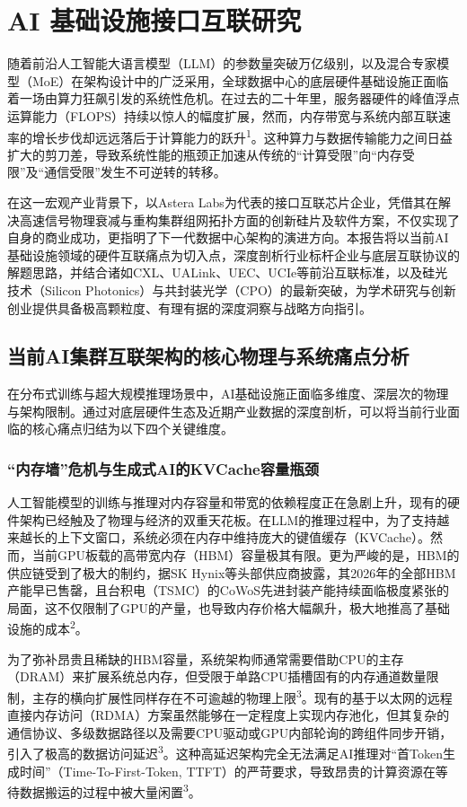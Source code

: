 \chapter{AI 基础设施接口互联研究}

随着前沿人工智能大语言模型（LLM）的参数量突破万亿级别，以及混合专家模型（MoE）在架构设计中的广泛采用，全球数据中心的底层硬件基础设施正面临着一场由算力狂飙引发的系统性危机。在过去的二十年里，服务器硬件的峰值浮点运算能力（FLOPS）持续以惊人的幅度扩展，然而，内存带宽与系统内部互联速率的增长步伐却远远落后于计算能力的跃升\textsuperscript{1}。这种算力与数据传输能力之间日益扩大的剪刀差，导致系统性能的瓶颈正加速从传统的``计算受限''向``内存受限''及``通信受限''发生不可逆转的转移。

在这一宏观产业背景下，以Astera Labs为代表的接口互联芯片企业，凭借其在解决高速信号物理衰减与重构集群组网拓扑方面的创新硅片及软件方案，不仅实现了自身的商业成功，更指明了下一代数据中心架构的演进方向。本报告将以当前AI基础设施领域的硬件互联痛点为切入点，深度剖析行业标杆企业与底层互联协议的解题思路，并结合诸如CXL、UALink、UEC、UCIe等前沿互联标准，以及硅光技术（Silicon Photonics）与共封装光学（CPO）的最新突破，为学术研究与创新创业提供具备极高颗粒度、有理有据的深度洞察与战略方向指引。

\section{当前AI集群互联架构的核心物理与系统痛点分析}

在分布式训练与超大规模推理场景中，AI基础设施正面临多维度、深层次的物理与架构限制。通过对底层硬件生态及近期产业数据的深度剖析，可以将当前行业面临的核心痛点归结为以下四个关键维度。

\subsection{``内存墙''危机与生成式AI的KVCache容量瓶颈}

人工智能模型的训练与推理对内存容量和带宽的依赖程度正在急剧上升，现有的硬件架构已经触及了物理与经济的双重天花板。在LLM的推理过程中，为了支持越来越长的上下文窗口，系统必须在内存中维持庞大的键值缓存（KVCache）。然而，当前GPU板载的高带宽内存（HBM）容量极其有限。更为严峻的是，HBM的供应链受到了极大的制约，据SK Hynix等头部供应商披露，其2026年的全部HBM产能早已售罄，且台积电（TSMC）的CoWoS先进封装产能持续面临极度紧张的局面，这不仅限制了GPU的产量，也导致内存价格大幅飙升，极大地推高了基础设施的成本\textsuperscript{2}。

为了弥补昂贵且稀缺的HBM容量，系统架构师通常需要借助CPU的主存（DRAM）来扩展系统总内存，但受限于单路CPU插槽固有的内存通道数量限制，主存的横向扩展性同样存在不可逾越的物理上限\textsuperscript{3}。现有的基于以太网的远程直接内存访问（RDMA）方案虽然能够在一定程度上实现内存池化，但其复杂的通信协议、多级数据路径以及需要CPU驱动或GPU内部轮询的跨组件同步开销，引入了极高的数据访问延迟\textsuperscript{3}。这种高延迟架构完全无法满足AI推理对``首Token生成时间''（Time-To-First-Token, TTFT）的严苛要求，导致昂贵的计算资源在等待数据搬运的过程中被大量闲置\textsuperscript{3}。

